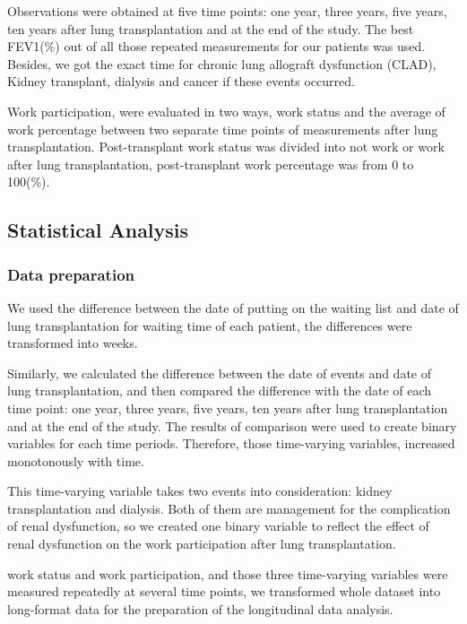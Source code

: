 \documentclass[11pt, a4paper]{article}\usepackage[]{graphicx}\usepackage[]{color}
\begin{document}
Observations were obtained at five time points: one year, three years, five years, ten years after lung transplantation and at the end of the study. The best FEV1(\%) out of all those repeated measurements for our patients was used. Besides, we got the exact time for chronic lung allograft dysfunction (CLAD), Kidney transplant, dialysis and cancer if these events occurred.

Work participation, were evaluated in two ways, work status and the average of work percentage between two separate time points of measurements after lung transplantation. Post-transplant work status was divided into not work or work after lung transplantation, post-transplant work percentage was from 0 to 100(\%).
  


\vspace{0.5cm}
\subsection*{Statistical Analysis} \label{subsec:statmethods}
\subsubsection*{Data preparation}

We used the difference between the date of putting on the waiting list and date of lung transplantation for waiting time of each patient, the differences were transformed into weeks.

Similarly, we calculated the difference between the date of events and date of lung transplantation,  and then compared the difference with the date of each time point: one year, three years, five years, ten years after lung transplantation and at the end of the study. The results of comparison were used to create binary variables for each time periods. Therefore, those time-varying variables, increased monotonously with time.

This time-varying variable takes two events into consideration: kidney transplantation and dialysis. Both of them are management for the complication of renal dysfunction, so we created one binary variable to reflect the effect of renal dysfunction on the work participation after lung transplantation.

work status and work participation, and those three time-varying variables were measured repeatedly at several time points, we transformed whole dataset into long-format data for the preparation of the longitudinal data analysis.
\end{document}

